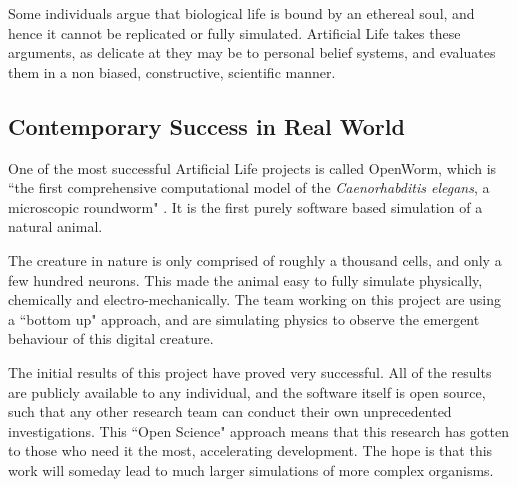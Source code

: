 \documentclass[10pt,a4paper]{article}
\begin{document}
				Some individuals argue that biological life is bound by an ethereal soul, and hence it cannot be replicated or fully simulated. Artificial Life takes these arguments, as delicate at they may be to personal belief systems, and evaluates them in a non biased, constructive, scientific manner.
			
			\subsection{Contemporary Success in Real World}
			
				One of the most successful Artificial Life projects is called OpenWorm, which is ``the first comprehensive computational model of the \textsl{Caenorhabditis elegans}, a microscopic roundworm" \cite{openworm}. It is the first purely software based simulation of a natural animal.
			
				The creature in nature is only comprised of roughly a thousand cells, and only a few hundred neurons. This made the animal easy to fully simulate physically, chemically and electro-mechanically. The team working on this project are using a ``bottom up" approach, and are simulating physics to observe the emergent behaviour of this digital creature. 
			
				The initial results of this project have proved very successful. All of the results are publicly available to any individual, and the software itself is open source, such that any other research team can conduct their own unprecedented investigations. This ``Open Science" approach means that this research has gotten to those who need it the most, accelerating development. The hope is that this work will someday lead to much larger simulations of more complex organisms.
				
					
		\pagebreak
		\printbibliography
\end{document}

